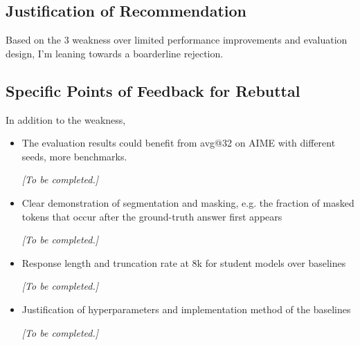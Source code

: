 \documentclass[11pt,a4paper]{article}
\begin{document}
\subsection*{Justification of Recommendation}
Based on the 3 weakness over limited performance improvements and evaluation design, I'm leaning towards a boarderline rejection.

\subsection*{Specific Points of Feedback for Rebuttal}
In addition to the weakness,

\begin{itemize}
\item The evaluation results could benefit from avg@32 on AIME with different seeds, more benchmarks.
\par{}
\begin{responsebox}[frametitle={Response to Q1},nobreak=true]
\textit{[To be completed.]}\par\vspace{1em}
\end{responsebox}

\item Clear demonstration of segmentation and masking, e.g. the fraction of masked tokens that occur after the ground-truth answer first appears
\par{}
\begin{responsebox}[frametitle={Response to Q2},nobreak=true]
\textit{[To be completed.]}\par\vspace{1em}
\end{responsebox}

\item Response length and truncation rate at 8k for student models over baselines
\par{}
\begin{responsebox}[frametitle={Response to Q3},nobreak=true]
\textit{[To be completed.]}\par\vspace{1em}
\end{responsebox}

\item Justification of hyperparameters and implementation method of the baselines
\par{}
\begin{responsebox}[frametitle={Response to Q4},nobreak=true]
\textit{[To be completed.]}\par\vspace{1em}
\end{responsebox}

\end{itemize}
\end{document}
